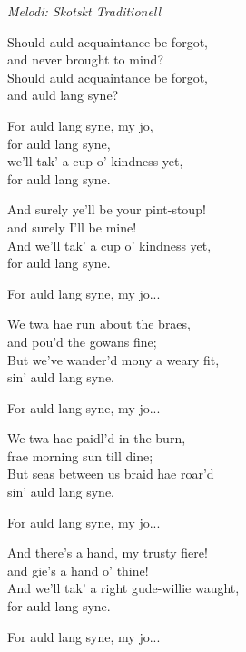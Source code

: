 {\footnotesize\textit{Melodi: Skotskt Traditionell}}\par
\vspace{10pt}
Should auld acquaintance be forgot,\\
and never brought to mind?\\
Should auld acquaintance be forgot,\\
and auld lang syne?\par
\vspace{10pt}
For auld lang syne, my jo,\\
for auld lang syne,\\
we'll tak' a cup o' kindness yet,\\
for auld lang syne.\par
\vspace{10pt}
And surely ye'll be your pint-stoup!\\
and surely I'll be mine!\\
And we'll tak' a cup o' kindness yet,\\
for auld lang syne.\par
\vspace{10pt}
For auld lang syne, my jo...\par
\vspace{10pt}
We twa hae run about the braes,\\
and pou'd the gowans fine;\\
But we've wander'd mony a weary fit,\\
sin' auld lang syne.\par
\vspace{10pt}
For auld lang syne, my jo...\par
\vspace{10pt}
We twa hae paidl'd in the burn,\\
frae morning sun till dine;\\
But seas between us braid hae roar'd\\
sin' auld lang syne.\par
\newpage
For auld lang syne, my jo...\par
\vspace{10pt}
And there's a hand, my trusty fiere!\\
and gie's a hand o' thine!\\
And we'll tak' a right gude-willie waught,\\
for auld lang syne.\par
\vspace{10pt}
For auld lang syne, my jo...\par
